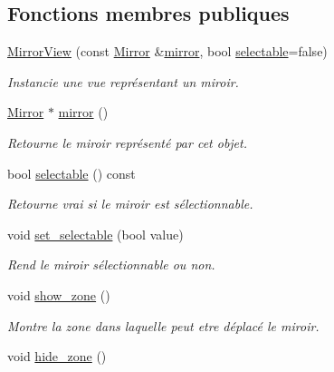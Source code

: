 \subsection*{Fonctions membres publiques}
\begin{DoxyCompactItemize}
\item 
\hyperlink{classMirrorView_a04dab41c29196186c918e60a1b2487b2}{Mirror\+View} (const \hyperlink{classMirror}{Mirror} \&\hyperlink{classMirrorView_a61c25961d7e140d5a8ff38aeb5ce8da2}{mirror}, bool \hyperlink{classMirrorView_ad52e5d438a1b61b135c2ca56cadcd090}{selectable}=false)
\begin{DoxyCompactList}\small\item\em Instancie une vue représentant un miroir. \end{DoxyCompactList}\item 
\hyperlink{classMirror}{Mirror} $\ast$ \hyperlink{classMirrorView_a61c25961d7e140d5a8ff38aeb5ce8da2}{mirror} ()
\begin{DoxyCompactList}\small\item\em Retourne le miroir représenté par cet objet. \end{DoxyCompactList}\item 
bool \hyperlink{classMirrorView_ad52e5d438a1b61b135c2ca56cadcd090}{selectable} () const 
\begin{DoxyCompactList}\small\item\em Retourne vrai si le miroir est sélectionnable. \end{DoxyCompactList}\item 
void \hyperlink{classMirrorView_a67fc521e337191818dba7c1abfbb6e84}{set\+\_\+selectable} (bool value)
\begin{DoxyCompactList}\small\item\em Rend le miroir sélectionnable ou non. \end{DoxyCompactList}\item 
\hypertarget{classMirrorView_ac9a758db6d2c5c99e1f5923a6248d296}{void \hyperlink{classMirrorView_ac9a758db6d2c5c99e1f5923a6248d296}{show\+\_\+zone} ()}\label{classMirrorView_ac9a758db6d2c5c99e1f5923a6248d296}

\begin{DoxyCompactList}\small\item\em Montre la zone dans laquelle peut etre déplacé le miroir. \end{DoxyCompactList}\item 
\hypertarget{classMirrorView_a64fbd2447cb892fd6ffebf14a525c806}{void \hyperlink{classMirrorView_a64fbd2447cb892fd6ffebf14a525c806}{hide\+\_\+zone} ()}\label{classMirrorView_a64fbd2447cb892fd6ffebf14a525c806}


\end{DoxyCompactItemize}

